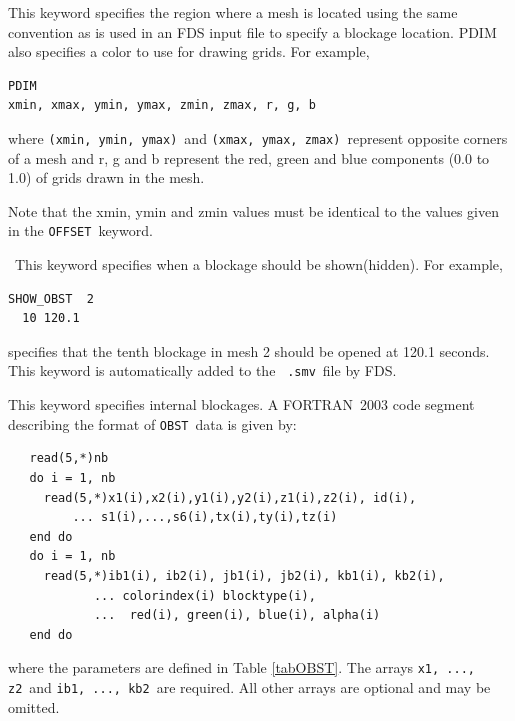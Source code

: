 \documentclass[11pt,twoside]{book}
\begin{document}
This keyword specifies the region where a mesh is located
using the same convention as is used in an FDS input file to specify a blockage location.
PDIM also specifies a color to use for drawing grids.  For example,
\begin{lstlisting}
PDIM
xmin, xmax, ymin, ymax, zmin, zmax, r, g, b
\end{lstlisting}
where {\tt (xmin,~ymin,~ymax)}\ and {\tt (xmax,~ymax,~zmax)}\
represent opposite corners of a mesh
and r, g and b represent the red, green and blue components (0.0 to 1.0) of grids drawn
in the mesh.

Note that the xmin, ymin and zmin values must be identical to the values given in the
{\tt OFFSET}\ keyword.


\ This keyword specifies when a
blockage should be shown(hidden). For example,
\begin{lstlisting}
SHOW_OBST  2
  10 120.1
\end{lstlisting}
specifies that the tenth blockage in mesh 2 should be opened at
120.1 seconds.  This keyword is automatically added to the {\tt
.smv}\ file by FDS.

This keyword specifies internal blockages. A
FORTRAN~2003 code segment describing the format of {\tt OBST}\ data
is given by:
\begin{lstlisting}
   read(5,*)nb
   do i = 1, nb
     read(5,*)x1(i),x2(i),y1(i),y2(i),z1(i),z2(i), id(i),
         ... s1(i),...,s6(i),tx(i),ty(i),tz(i)
   end do
   do i = 1, nb
     read(5,*)ib1(i), ib2(i), jb1(i), jb2(i), kb1(i), kb2(i),
            ... colorindex(i) blocktype(i),
            ...  red(i), green(i), blue(i), alpha(i)
   end do
\end{lstlisting}
where the parameters are defined in Table \ref{tabOBST}.
The arrays {\tt x1, ..., z2}\ and {\tt ib1, ..., kb2}\ are
required. All other arrays are optional and may be omitted.
\end{document}
